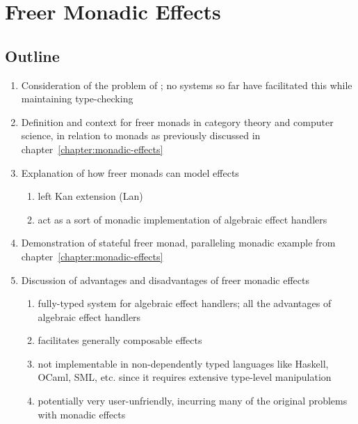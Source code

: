 \chapter{Freer Monadic Effects}
\label{chapter:freer-monadic-effects}

\section{Outline}
\begin{enumerate}
  \item Consideration of the problem of ; no systems so far have facilitated this while maintaining type-checking
  \item Definition and context for freer monads in category theory and computer science, in relation to monads as previously discussed in chapter~\ref{chapter:monadic-effects}
  \item Explanation of how freer monads can model effects
  \begin{enumerate}
    \item left Kan extension (Lan)
    \item act as a sort of monadic implementation of algebraic effect handlers
  \end{enumerate}
  \item Demonstration of stateful freer monad, paralleling monadic example from chapter~\ref{chapter:monadic-effects}
  \item Discussion of advantages and disadvantages of freer monadic effects
  \begin{enumerate}
    \item fully-typed system for algebraic effect handlers; all the advantages of algebraic effect handlers
    \item facilitates generally composable effects
    \item not implementable in non-dependently typed languages like Haskell, OCaml, SML, etc. since it requires extensive type-level manipulation
    \item potentially very user-unfriendly, incurring many of the original problems with monadic effects
  \end{enumerate}
\end{enumerate}
